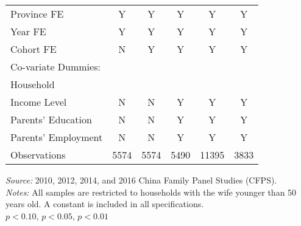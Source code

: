 \documentclass[12pt]{extarticle}
\begin{document}
\begin{table}
\begin{threeparttable}
\begin{tabular}{l*{5}{c}}
\hline
Province FE &  Y &  Y & Y & Y & Y \\
Year FE &  Y &  Y & Y & Y & Y \\
Cohort FE & N & Y & Y & Y & Y \\
Co-variate Dummies: \\
\quad Household \\
\qquad Income Level & N & N & Y & Y & Y \\
\quad Parents' Education &  N &  N & Y & Y & Y \\
\quad Parents' Employment &  N &  N & Y & Y & Y \\
\hline
Observations        &        5574   &        5574   &        5490   &       11395   &        3833   \\
\hline\hline
\end{tabular}
\begin{tablenotes}
\footnotesize \textit{Source:} 2010, 2012, 2014, and 2016 China Family Panel Studies (CFPS). \\
\textit{Notes:} All samples are restricted to households with the wife younger than 50 years old. A constant is included in all specifications. \\
\quad \sym{*} \(p<0.10\), \sym{**} \(p<0.05\), \sym{***} \(p<0.01\)
\end{tablenotes}
\end{threeparttable}
\end{table}
\end{document}
